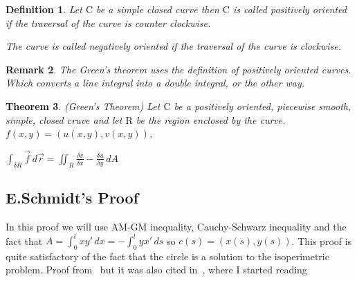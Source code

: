 \documentclass[a4paper]{book}
\newtheorem{theorem}{Theorem}%
\newtheorem{remark}[theorem]{Remark}%
\newtheorem{definition}[theorem]{Definition}%
\numberwithin{theorem}{section}%
\begin{document}
\begin{definition}
    Let $\mathrm{C}$ be a simple closed curve then $\mathrm{C}$ is called positively oriented if the traversal of the curve is counter clockwise.

    The curve is called negatively oriented if the traversal of the curve is clockwise. 
\end{definition}

\begin{remark}
    The Green's theorem uses the definition of positively oriented curves. Which converts a line integral into a double integral, or the other way.
\end{remark}

\begin{theorem} (Green's Theorem)
    Let $\mathrm{C}$ be a positively oriented, piecewise smooth, simple, closed cruve and let $\mathrm{R}$ be the region enclosed by the curve. $f(x,y)=(u(x,y),v(x,y))$,

    \begin{center}
        $\displaystyle \int_{\delta R}\overrightarrow{f}\,d\overrightarrow{r}=\iint_{R}\frac{\delta v}{\delta x}-\frac{\delta u}{\delta y}\,dA$
    \end{center}
\end{theorem}

\subsection{E.Schmidt's Proof}
In this proof we will use AM-GM inequality, Cauchy-Schwarz inequality and the fact that $\displaystyle A=\int_{0}^{l} xy' \,dx = -\int_{0}^{l} yx' \,ds$ so $\displaystyle c(s)=(x(s),y(s))$. This proof is quite satisfactory of the fact that the circle is a solution to the isoperimetric problem. Proof from~\citep{do2016differential} but it was also cited in~\citep{gluck2012isoperimetric}, where I started reading~\citep{do2016differential}
\leavevmode \\
\end{document}
